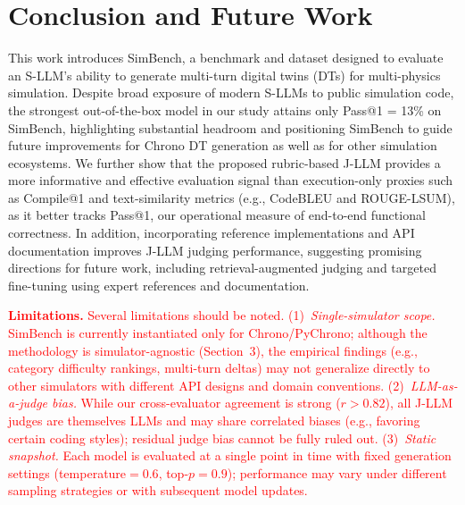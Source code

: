 \documentclass{ieeeaccess}
\newcommand{\updatedText}[1]{\textcolor{red}{#1}}
\newcommand{\noindentBold}[1]{\par\noindent\textbf{#1}}
\begin{document}

\section{Conclusion and Future Work}
\label{sec:conclusion}




This work introduces SimBench, a benchmark and dataset designed to evaluate an S-LLM's ability to generate multi-turn digital twins (DTs) for multi-physics simulation. Despite broad exposure of modern S-LLMs to public simulation code, the strongest out-of-the-box model in our study attains only Pass@1 = 13\% on SimBench, highlighting substantial headroom and positioning SimBench to guide future improvements for Chrono DT generation as well as for other simulation ecosystems. We further show that the proposed rubric-based J-LLM provides a more informative and effective evaluation signal than execution-only proxies such as Compile@1 and text-similarity metrics (e.g., CodeBLEU and ROUGE-LSUM), as it better tracks Pass@1, our operational measure of end-to-end functional correctness. In addition, incorporating reference implementations and API documentation improves J-LLM judging performance, suggesting promising directions for future work, including retrieval-augmented judging and targeted fine-tuning using expert references and documentation.

\updatedText{\noindentBold{Limitations.}
Several limitations should be noted.
(1)~\emph{Single-simulator scope.} SimBench is currently instantiated only for Chrono/PyChrono; although the methodology is simulator-agnostic (Section~3), the empirical findings (e.g., category difficulty rankings, multi-turn deltas) may not generalize directly to other simulators with different API designs and domain conventions.
(2)~\emph{LLM-as-a-judge bias.} While our cross-evaluator agreement is strong ($r > 0.82$), all J-LLM judges are themselves LLMs and may share correlated biases (e.g., favoring certain coding styles); residual judge bias cannot be fully ruled out.
(3)~\emph{Static snapshot.} Each model is evaluated at a single point in time with fixed generation settings (temperature${}= 0.6$, top-$p = 0.9$); performance may vary under different sampling strategies or with subsequent model updates.}
\end{document}
